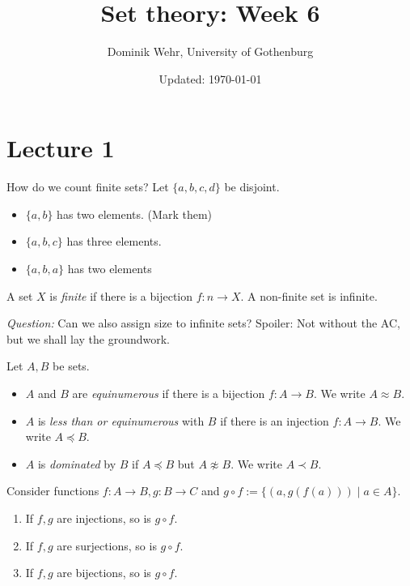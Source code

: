 \documentclass{whrartcl}
\title{Set theory: Week 6}
\author{Dominik Wehr, University of Gothenburg}
\date{Updated: \today}
\begin{document}
\maketitle

\section{Lecture 1}

\begin{remark}
  How do we count finite sets? Let $\{a, b, c, d\}$ be disjoint.
  \begin{itemize}
  \item $\{a, b\}$ has two elements. (Mark them)
  \item $\{a, b, c\}$ has three elements.
  \item $\{a, b, a\}$ has two elements
  \end{itemize}
\end{remark}

\begin{definition}
  A set $X$ is \emph{finite} if there is a bijection $f : n \to X$. A non-finite
  set is infinite.
\end{definition}

\emph{Question:} Can we also assign size to infinite sets? Spoiler: Not without
the AC, but we shall lay the groundwork.

\begin{definition}
  Let $A, B$ be sets.
  \begin{itemize}
  \item $A$ and $B$ are \emph{equinumerous} if there is a bijection $f : A \to
    B$. We write $A \approx B$.
  \item $A$ is \emph{less than or equinumerous} with $B$ if there is an
    injection $f : A \to B$. We write $A \preceq B$.
  \item $A$ is \emph{dominated} by $B$ if $A \preceq B$ but $A \not\approx B$. We
    write $A \prec B$.
  \end{itemize}
\end{definition}

\begin{lemma}
  Consider functions $f : A \to B, g : B \to C$ and $g \circ f := \{(a, g(f(a)))
  \mid a \in A\}$.
  \begin{enumerate}
  \item If $f, g$ are injections, so is $g \circ f$.
  \item If $f, g$ are surjections, so is $g \circ f$.
  \item If $f, g$ are bijections, so is $g \circ f$.
  \end{enumerate}
\end{lemma}
\end{document}

